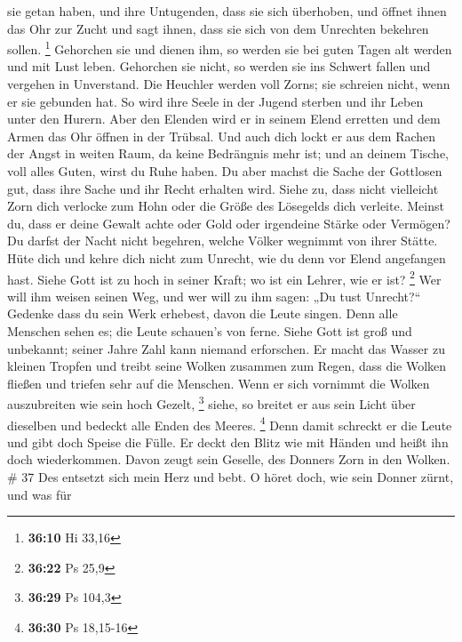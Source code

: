sie getan haben, und ihre Untugenden, dass sie sich überhoben,
 und öffnet ihnen das Ohr zur Zucht und sagt ihnen, dass
sie sich von dem Unrechten bekehren sollen. \footnote{\textbf{36:10} Hi
  33,16}  Gehorchen sie und dienen ihm, so werden sie bei
guten Tagen alt werden und mit Lust leben.  Gehorchen sie
nicht, so werden sie ins Schwert fallen und vergehen in Unverstand.
 Die Heuchler werden voll Zorns; sie schreien nicht, wenn
er sie gebunden hat.  So wird ihre Seele in der Jugend
sterben und ihr Leben unter den Hurern.  Aber den Elenden
wird er in seinem Elend erretten und dem Armen das Ohr öffnen in der
Trübsal.  Und auch dich lockt er aus dem Rachen der Angst
in weiten Raum, da keine Bedrängnis mehr ist; und an deinem Tische, voll
alles Guten, wirst du Ruhe haben.  Du aber machst die
Sache der Gottlosen gut, dass ihre Sache und ihr Recht erhalten wird.
 Siehe zu, dass nicht vielleicht Zorn dich verlocke zum
Hohn oder die Größe des Lösegelds dich verleite.  Meinst
du, dass er deine Gewalt achte oder Gold oder irgendeine Stärke oder
Vermögen?  Du darfst der Nacht nicht begehren, welche
Völker wegnimmt von ihrer Stätte.  Hüte dich und kehre
dich nicht zum Unrecht, wie du denn vor Elend angefangen hast.
 Siehe Gott ist zu hoch in seiner Kraft; wo ist ein
Lehrer, wie er ist? \footnote{\textbf{36:22} Ps 25,9} 
Wer will ihm weisen seinen Weg, und wer will zu ihm sagen: „Du tust
Unrecht?{}``  Gedenke dass du sein Werk erhebest, davon
die Leute singen.  Denn alle Menschen sehen es; die Leute
schauen's von ferne.  Siehe Gott ist groß und unbekannt;
seiner Jahre Zahl kann niemand erforschen.  Er macht das
Wasser zu kleinen Tropfen und treibt seine Wolken zusammen zum Regen,
 dass die Wolken fließen und triefen sehr auf die
Menschen.  Wenn er sich vornimmt die Wolken auszubreiten
wie sein hoch Gezelt, \footnote{\textbf{36:29} Ps 104,3} 
siehe, so breitet er aus sein Licht über dieselben und bedeckt alle
Enden des Meeres. \footnote{\textbf{36:30} Ps 18,15-16} 
Denn damit schreckt er die Leute und gibt doch Speise die Fülle.
 Er deckt den Blitz wie mit Händen und heißt ihn doch
wiederkommen.  Davon zeugt sein Geselle, des Donners Zorn
in den Wolken. \# 37  Des entsetzt sich mein Herz und
bebt.  O höret doch, wie sein Donner zürnt, und was für
